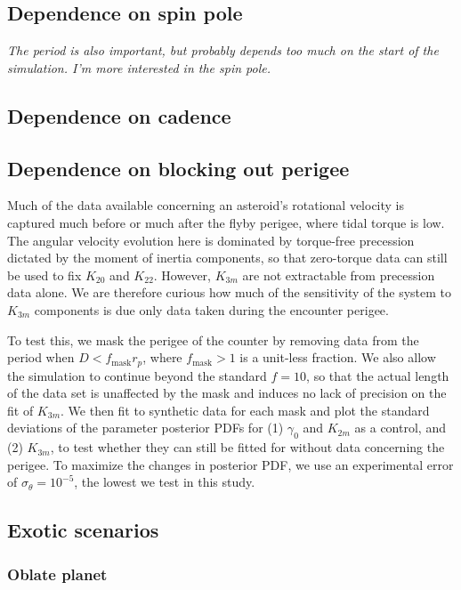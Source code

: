 \documentclass{aastex631}
\newcommand{\jtd}[1]{{\color{red}\textit{#1}}}
\begin{document}
\subsection{Dependence on spin pole}

\jtd{The period is also important, but probably depends too much on the start of the simulation. I'm more interested in the spin pole.}

\subsection{Dependence on cadence}

\subsection{Dependence on blocking out perigee}
\label{sec:block-perigee}
Much of the data available concerning an asteroid's rotational velocity is captured much before or much after the flyby perigee, where tidal torque is low. The angular velocity evolution here is dominated by torque-free precession dictated by the moment of inertia components, so that zero-torque data can still be used to fix $K_{20}$ and $K_{22}$. However, $K_{3m}$ are not extractable from precession data alone. We are therefore curious how much of the sensitivity of the system to $K_{3m}$ components is due only data taken during the encounter perigee.

To test this, we mask the perigee of the counter by removing data from the period when $D < f_\textrm{mask} r_p$, where $f_\textrm{mask}>1$ is a unit-less fraction. We also allow the simulation to continue beyond the standard $f = 10$, so that the actual length of the data set is unaffected by the mask and induces no lack of precision on the fit of $K_{3m}$. We then fit to synthetic data for each mask and plot the standard deviations of the parameter posterior PDFs for (1) $\gamma_0$ and $K_{2m}$ as a control, and (2) $K_{3m}$, to test whether they can still be fitted for without data concerning the perigee. To maximize the changes in posterior PDF, we use an experimental error of $\sigma_\theta = 10^{-5}$, the lowest we test in this study.

\subsection{Exotic scenarios}

\subsubsection{Oblate planet}
\end{document}
